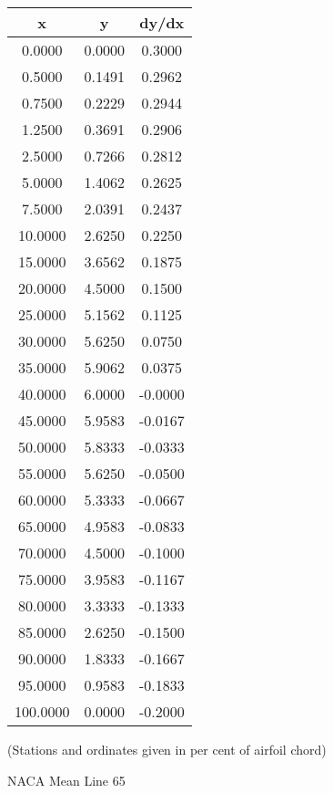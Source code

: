 \documentclass[11pt]{book}
\begin{document}
 \vspace{8mm}
 \begin{tabular}{|c|c|c|}  \hline
 x & y & dy/dx \\
 \hline
0.0000 & 0.0000 & 0.3000 \\
0.5000 & 0.1491 & 0.2962 \\
0.7500 & 0.2229 & 0.2944 \\
1.2500 & 0.3691 & 0.2906 \\
2.5000 & 0.7266 & 0.2812 \\
5.0000 & 1.4062 & 0.2625 \\
7.5000 & 2.0391 & 0.2437 \\
10.0000 & 2.6250 & 0.2250 \\
15.0000 & 3.6562 & 0.1875 \\
20.0000 & 4.5000 & 0.1500 \\
25.0000 & 5.1562 & 0.1125 \\
30.0000 & 5.6250 & 0.0750 \\
35.0000 & 5.9062 & 0.0375 \\
40.0000 & 6.0000 & -0.0000 \\
45.0000 & 5.9583 & -0.0167 \\
50.0000 & 5.8333 & -0.0333 \\
55.0000 & 5.6250 & -0.0500 \\
60.0000 & 5.3333 & -0.0667 \\
65.0000 & 4.9583 & -0.0833 \\
70.0000 & 4.5000 & -0.1000 \\
75.0000 & 3.9583 & -0.1167 \\
80.0000 & 3.3333 & -0.1333 \\
85.0000 & 2.6250 & -0.1500 \\
90.0000 & 1.8333 & -0.1667 \\
95.0000 & 0.9583 & -0.1833 \\
100.0000 & 0.0000 & -0.2000 \\
 \hline
 \end{tabular}
 \vspace{8mm}

(Stations and ordinates given in per cent of airfoil chord)

 \newpage
 \label{ml65}
 \begin{Large}
 NACA Mean Line 65
 \end{Large}
  
\end{document}
